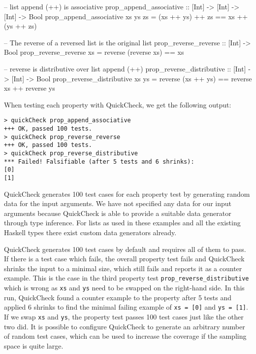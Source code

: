 \begin{HaskellCode}
-- list append (++) is associative
prop_append_associative :: [Int] -> [Int] -> [Int] -> Bool
prop_append_associative xs ys zs = (xs ++ ys) ++ zs == xs ++ (ys ++ zs)

-- The reverse of a reversed list is the original list
prop_reverse_reverse :: [Int] -> Bool
prop_reverse_reverse xs = reverse (reverse xs) == xs

-- reverse is distributive over list append (++)
prop_reverse_distributive :: [Int] -> [Int] -> Bool
prop_reverse_distributive xs ys 
  = reverse (xs ++ ys) == reverse xs ++ reverse ys
\end{HaskellCode}

When testing each property with QuickCheck, we get the following output:

\begin{verbatim}
> quickCheck prop_append_associative
+++ OK, passed 100 tests.
> quickCheck prop_reverse_reverse
+++ OK, passed 100 tests.
> quickCheck prop_reverse_distributive
*** Failed! Falsifiable (after 5 tests and 6 shrinks):    
[0]
[1]
\end{verbatim}

QuickCheck generates 100 test cases for each property test by generating random data for the input arguments. We have not specified any data for our input arguments because QuickCheck is able to provide a suitable data generator through type inference. For lists as used in these examples and all the existing Haskell types there exist custom data generators already. %

QuickCheck generates 100 test cases by default and requires all of them to pass. If there is a test case which fails, the overall property test fails and QuickCheck shrinks the input to a minimal size, which still fails and reports it as a counter example. This is the case in the third property test \texttt{prop\_reverse\_distributive} which is wrong as \texttt{xs} and \texttt{ys} need to be swapped on the right-hand side. In this run, QuickCheck found a counter example to the property after 5 tests and applied 6 shrinks to find the minimal failing example of \texttt{xs = [0]} and \texttt{ys = [1]}. If we swap \texttt{xs} and \texttt{ys}, the property test passes 100 test cases just like the other two did. It is possible to configure QuickCheck to generate an arbitrary number of random test cases, which can be used to increase the coverage if the sampling space is quite large.